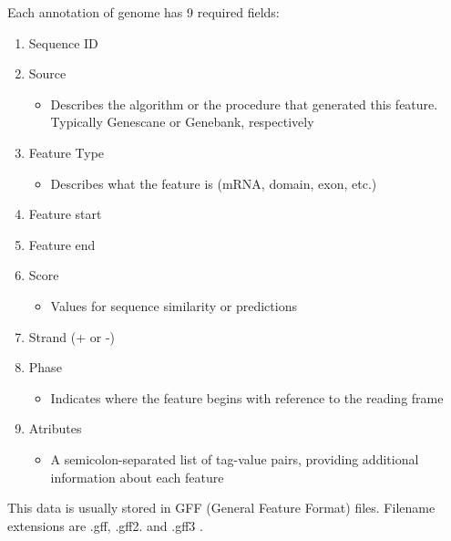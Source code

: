 Each annotation of genome has 9 required fields:
\begin{enumerate}
    \item Sequence ID
    \item Source 
    \begin{itemize}
        \item Describes the algorithm or the procedure that generated this feature. Typically Genescane or Genebank, respectively
    \end{itemize}
    \item Feature Type
    \begin{itemize}
        \item Describes what the feature is (mRNA, domain, exon, etc.)
    \end{itemize}
    \item Feature start
    \item Feature end
    \item Score 
    \begin{itemize}
        \item Values for sequence similarity or predictions
    \end{itemize}
    \item Strand (+ or -)
    \item Phase
    \begin{itemize}
        \item Indicates where the feature begins with reference to the reading frame
    \end{itemize}
    \item Atributes
    \begin{itemize}
        \item A semicolon-separated list of tag-value pairs, providing additional information about each feature
    \end{itemize}
\end{enumerate}
This data is usually stored in GFF (General Feature Format) files. Filename extensions are .gff, .gff2. and .gff3 \cite{gff2}.

